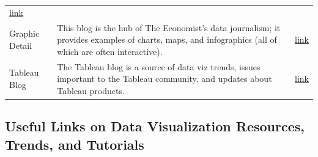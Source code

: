 \documentclass[]{book}
\begin{document}
\begin{longtable}[]{@{}lll@{}}
\begin{minipage}[t]{0.11\columnwidth}
\href{https://www.theatlas.com/}{link}\strut
\end{minipage}\tabularnewline
\begin{minipage}[t]{0.11\columnwidth}\raggedright\strut
Graphic Detail\strut
\end{minipage} & \begin{minipage}[t]{0.20\columnwidth}\raggedright\strut
This blog is the hub of The Economist's data journalism; it provides
examples of charts, maps, and infographics (all of which are often
interactive).\strut
\end{minipage} & \begin{minipage}[t]{0.11\columnwidth}\raggedright\strut
\href{https://www.economist.com/blogs/graphicdetail}{link}\strut
\end{minipage}\tabularnewline
\begin{minipage}[t]{0.11\columnwidth}\raggedright\strut
Tableau Blog\strut
\end{minipage} & \begin{minipage}[t]{0.20\columnwidth}\raggedright\strut
The Tableau blog is a source of data viz trends, issues important to the
Tableau community, and updates about Tableau products.\strut
\end{minipage} & \begin{minipage}[t]{0.11\columnwidth}\raggedright\strut
\href{https://www.tableau.com/about/blog}{link}\strut
\end{minipage}\tabularnewline
\bottomrule
\end{longtable}

\subsection{Useful Links on Data Visualization Resources, Trends, and
Tutorials}\label{useful-links-on-data-visualization-resources-trends-and-tutorials-1}
\end{document}
